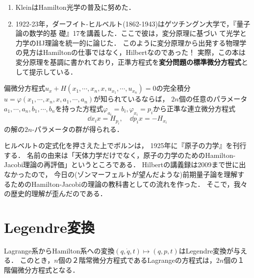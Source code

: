 \documentclass[uplatex, dvipdfmx]{jsreport}
\begin{document}
\begin{history}
    \begin{enumerate}
        \item KleinはHamilton光学の普及に努めた．
        \item 1922-23年，ダーフイト-ヒルベルト(1862-1943)はゲツチングン大学で，『量子論の数学的基
        礎』17を講義した．ここで彼は，変分原理に基づい
        て光学と力学のHJ理論を統一的に論じた．
        このように変分原理から出発する物理学の見方はHamiltonの仕事ではなく，Hilbertなのであった！
        実際，この本は変分原理を基調に書かれており，正準方程式を\textbf{変分問題の標準微分方程式}として提示している．
    \end{enumerate}
\end{history}

\begin{theorem}[Jacobi]
    偏微分方程式$u_x+H(x_1,\cdots,x_n,x,u_{x_1},\cdots,u_{x_n})=0$の完全積分$u=\varphi(x_1,\cdots,x_n,x,a_1,\cdots,a_n)$が知られているならば，
    $2n$個の任意のパラメータ$a_1,\cdots,a_n,b_1,\cdots,b_n$を持った方程式$\varphi_{a_i}=b_i,\varphi_{x_i}=p_i$から正準な連立微分方程式
    \[\dd{x_i}{x}=H_{p_i},\quad\dd{p_i}{x}=-H_{x_i}\]
    の解の$2n$-パラメータの群が得られる．
\end{theorem}

\begin{history}
    ヒルベルトの定式化を押さえた上でボルンは，
    1925年に『原子の力学』を刊行する．
    名前の由来は「天体力学だけでなく，原子の力学のためのHamilton-Jacobi理論の再評価」というところである．
    Hilbertの講義録は2009まで世に出なかったので，
    今日の(ゾンマーフェルトが望んだような)前期量子論を理解するためのHamilton-Jacobiの理論の教科書としての流れを作った．
    そこで，我々の歴史的理解が歪んだのである．
\end{history}

\section{Legendre変換}

\begin{tcolorbox}[colframe=ForestGreen, colback=ForestGreen!10!white,breakable,colbacktitle=ForestGreen!40!white,coltitle=black,fonttitle=\bfseries\sffamily,
title=]
    Lagrange系からHamilton系への変換$(q,\dot{q},t)\mapsto(q,p,t)$はLegendre変換が与える．
    このとき，$n$個の２階常微分方程式であるLagrangeの方程式は，$2n$個の１階偏微分方程式となる．
\end{tcolorbox}
\end{document}
